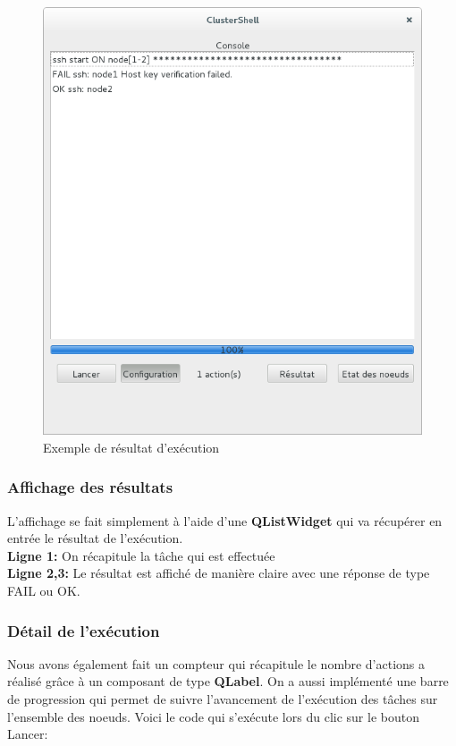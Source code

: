 \documentclass[a4paper,11pt]{article}
\begin{document}
\begin{figure}[H]
\centering
\includegraphics[scale=0.5]{exemple_affichage_console.png}
\caption{Exemple de résultat d'exécution}
\end{figure}
\subsubsection{Affichage des résultats}
\noindent L'affichage se fait simplement à l'aide d'une \textbf{QListWidget} qui va récupérer en entrée le résultat de l'exécution.\\
\textbf{Ligne 1:} On récapitule la tâche qui est effectuée\\
\textbf{Ligne 2,3:} Le résultat est affiché de manière claire avec une réponse de type FAIL ou OK.\\
\linebreak

\subsubsection{Détail de l'exécution}
Nous avons également fait un compteur qui récapitule le nombre d'actions a réalisé grâce à un composant de type \textbf{QLabel}. On a aussi implémenté une barre de progression qui permet de suivre l'avancement de l'exécution des tâches sur l'ensemble des noeuds.
\smallbreak
\pagebreak
\smallbreak
Voici le code qui s'exécute lors du clic sur le bouton Lancer:
\end{document}
